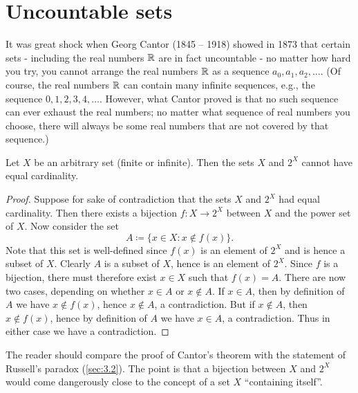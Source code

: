 \section{Uncountable sets}\label{sec:8.3}

\begin{note}
  It was great shock when Georg Cantor (1845 -- 1918) showed in 1873 that certain sets
  - including the real numbers \(\mathbb{R}\) are in fact uncountable -
  no matter how hard you try, you cannot arrange the real numbers \(\mathbb{R}\) as a sequence \(a_0, a_1, a_2, \dots\).
  (Of course, the real numbers \(\mathbb{R}\) can contain many infinite sequences, e.g., the sequence \(0, 1, 2, 3, 4, \dots\).
  However, what Cantor proved is that no such sequence can ever exhaust the real numbers;
  no matter what sequence of real numbers you choose, there will always be some real numbers that are not covered by that sequence.)
\end{note}

\begin{thm}\label{8.3.1}
  Let \(X\) be an arbitrary set (finite or infinite).
  Then the sets \(X\) and \(2^X\) cannot have equal cardinality.
\end{thm}

\begin{proof}
  Suppose for sake of contradiction that the sets \(X\) and \(2^X\) had equal cardinality.
  Then there exists a bijection \(f : X \to 2^X\) between \(X\) and the power set of \(X\).
  Now consider the set
  \[
    A \coloneqq \{x \in X : x \notin f(x)\}.
  \]
  Note that this set is well-defined since \(f(x)\) is an element of \(2^X\) and is hence a subset of \(X\).
  Clearly \(A\) is a subset of \(X\), hence is an element of \(2^X\).
  Since \(f\) is a bijection, there must therefore exist \(x \in X\) such that \(f(x) = A\).
  There are now two cases, depending on whether \(x \in A\) or \(x \notin A\).
  If \(x \in A\), then by definition of \(A\) we have \(x \notin f(x)\), hence \(x \notin A\), a contradiction.
  But if \(x \notin A\), then \(x \notin f(x)\), hence by definition of \(A\) we have \(x \in A\), a contradiction.
  Thus in either case we have a contradiction.
\end{proof}

\begin{rmk}\label{8.3.2}
  The reader should compare the proof of Cantor's theorem with the statement of Russell's paradox (\cref{sec:3.2}).
  The point is that a bijection between \(X\) and \(2^X\) would come dangerously close to the concept of a set \(X\) ``containing itself''.
\end{rmk}

